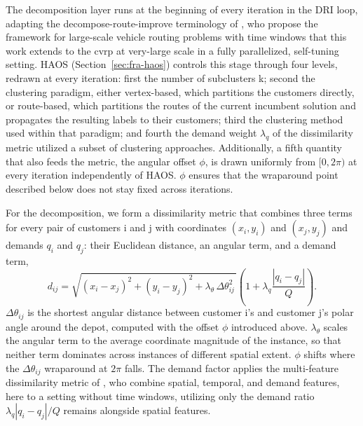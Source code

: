 
The decomposition layer runs at the beginning of every iteration in the DRI loop, adapting the decompose-route-improve terminology of \citet{kerscherDecomposerouteimproveFrameworkSolving2025}, who propose the framework for large-scale vehicle routing problems with time windows that this work extends to the \gls{cvrp} at very-large scale in a fully parallelized, self-tuning setting. HAOS (Section~\ref{sec:fra-haos}) controls this stage through four levels, redrawn at every iteration: first the number of subclusters k; second the clustering paradigm, either vertex-based, which partitions the customers directly, or route-based, which partitions the routes of the current incumbent solution and propagates the resulting labels to their customers; third the clustering method used within that paradigm; and fourth the demand weight $\lambda_q$ of the dissimilarity metric utilized a subset of clustering approaches. Additionally, a fifth quantity that also feeds the metric, the angular offset $\phi$, is drawn uniformly from $[0, 2\pi)$ at every iteration independently of HAOS. $\phi$ ensures that the wraparound point described below does not stay fixed across iterations.

For the decomposition, we form a dissimilarity metric that combines three terms for every pair of customers i and j with coordinates $(x_i, y_i)$ and $(x_j, y_j)$ and demands $q_i$ and $q_j$: their Euclidean distance, an angular term, and a demand term,
\begin{equation}
d_{ij} = \sqrt{(x_i - x_j)^2 + (y_i - y_j)^2 + \lambda_\theta \, \Delta\theta_{ij}^2\,} \left(1 + \lambda_q \frac{|q_i - q_j|}{Q}\right).
\label{eq:decomp-dissimilarity}
\end{equation}
$\Delta\theta_{ij}$ is the shortest angular distance between customer i's and customer j's polar angle around the depot, computed with the offset $\phi$ introduced above. $\lambda_\theta$ scales the angular term to the average coordinate magnitude of the instance, so that neither term dominates across instances of different spatial extent. $\phi$ shifts where the $\Delta\theta_{ij}$ wraparound at $2\pi$ falls. The demand factor applies the multi-feature dissimilarity metric of \citet{kerscherDecomposerouteimproveFrameworkSolving2025}, who combine spatial, temporal, and demand features, here to a setting without time windows, utilizing only the demand ratio $\lambda_q |q_i - q_j| / Q$ remains alongside spatial features.

